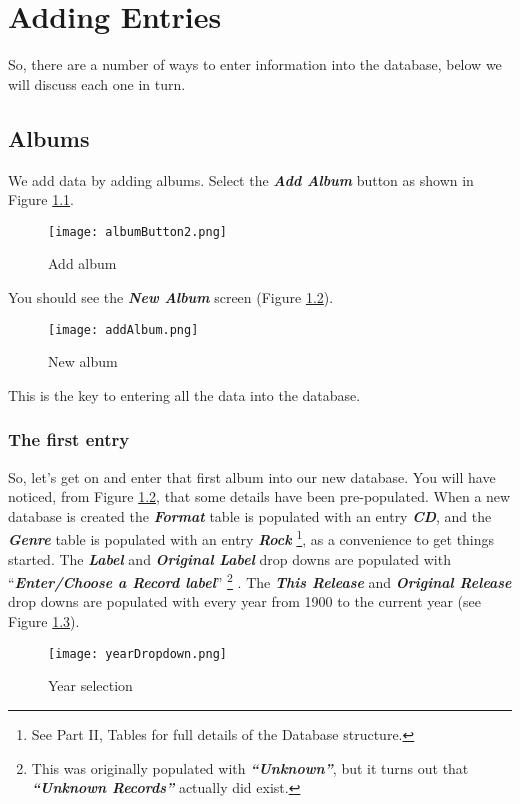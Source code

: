 \chapter{Adding Entries}
So, there are a number of ways to enter information into the database, below we will discuss each one in turn.

\section{Albums}
\label{sect:albums}
We add data by adding albums.  Select the 
\textit{\textbf{Add Album}}
button as shown in Figure 
\ref{fig:Add album}.
\begin{figure}[!ht]
 \centering
 \texttt{[image: albumButton2.png]} 
 \caption{Add album}
 \label{fig:Add album}
\end{figure}

You should see the 
\textit{\textbf{New Album}}
screen (Figure 
\ref{fig:New album}).
\begin{figure}[!ht]
 \centering
 \texttt{[image: addAlbum.png]}
 \caption{New album}
 \label{fig:New album}
\end{figure} 
This is the key to entering all the data into the database.
\newpage

\subsection{The first entry}
So, let's get on and enter that first album into our new database.  You will have noticed, from Figure
\ref{fig:New album},
that some details have been pre-populated.  When a new database is created the 
\textit{\textbf{Format}}
table is populated with an entry 
\textit{\textbf{CD}}, 
and the
\textit{\textbf{Genre}} 
table is populated with an entry 
\textit{\textbf{Rock}} 
\footnote{See Part II, Tables for  full details of the Database structure.},
as a convenience to get things started.  The 
\textit{\textbf{Label}} and 
\textit{\textbf{Original Label}}
drop downs are populated with
``\textit{\textbf{Enter/Choose a Record label}}''
\footnote{This was originally populated with \textit{\textbf{``Unknown''}}, but it turns out that \textit{\textbf{``Unknown Records''}} actually did exist.}
.  The 
\textit{\textbf{This Release}} and
\textit{\textbf{Original Release}}
drop downs are populated with every year from 1900 to the current year (see Figure 
\ref{fig:Year selection}).
\begin{figure}[!ht]
 \centering
 \texttt{[image: yearDropdown.png]}
 \caption{Year selection}
 \label{fig:Year selection}
\end{figure}


